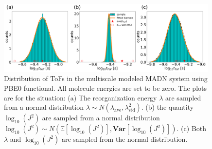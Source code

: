 \documentclass[letterpaper,12pt]{article}
\begin{document}
\begin{figure}[H]
    \centering
    \includegraphics[width=0.99\textwidth]{figs/MADN_HFX/fig_mle_MADN_noE.pdf}
    \caption{Distribution of ToFs in the multiscale modeled MADN system using PBE0 functional. All molecule energies are set to be zero.  
    The plots are for the situation: (a) The reorganization energy $\lambda$ are sampled from a normal distribution $\lambda \sim N(\lambda_\text{ave},\lambda^2_\text{std})$. (b) the quantity $\log_{10}(J^2)$ are sampled from a normal distribution $\log_{10}(J^2) \sim N(\mathbb{E}[\log_{10}(J^2)], \textbf{Var}[\log_{10}(J^2)] )$. (c) Both $\lambda$ and $\log_{10}(J^2)$ are sampled from the normal distribution. }
    \label{fig:mle_MADN_noE}
\end{figure}




\end{document}
